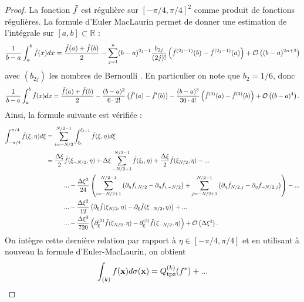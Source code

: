 \begin{proof}
La fonction $\tilde{f}$ est régulière sur $[-\pi/4, \pi/4]^2$ comme produit de fonctions régulières.
La formule d'Euler MacLaurin \cite{Demailly2016, Hardy2000, Monegato1998} permet de donner une estimation de l'intégrale sur $[a,b] \subset \mathbb{R}$ :
\begin{equation}
\dfrac{1}{b-a} \displaystyle\int_a^b \tilde{f}(x) dx = \dfrac{\tilde{f}(a) + \tilde{f}(b)}{2} - \displaystyle\sum\limits_{j=1}^n (b-a)^{2j-1} \dfrac{b_{2j}}{(2j)!} \left( \tilde{f}^{(2j-1)}(b) - \tilde{f}^{(2j-1)}(a)  \right) + \mathcal{O}\left( (b-a)^{2n+2}  \right) 
\end{equation}
avec $(b_{2j})$ les nombres de Bernoulli \cite{Conway2012}. En particulier on note que $b_2 = 1/6$, donc
\begin{equation}
\dfrac{1}{b-a} \displaystyle\int_a^b \tilde{f}(x) dx = \dfrac{\tilde{f}(a) + \tilde{f}(b)}{2} - \dfrac{(b-a)^2}{6 \cdot 2!} \left( \tilde{f}'(a) - \tilde{f}'(b) \right) - \dfrac{(b-a)^3}{30 \cdot 4!} \left( \tilde{f}^{(3)}(a) - \tilde{f}^{(3)}(b) \right) + \mathcal{O}\left( (b-a)^4 \right). 
\end{equation}
Ainsi, la formule suivante est vérifiée :
\begin{align*}
\displaystyle\int_{-\pi/4}^{\pi/4} \tilde{f}(\xi, \eta) d\xi & = \displaystyle\sum\limits_{i=-N/2}^{N/2-1} \displaystyle\int_{\xi_i}^{\xi_{i+1}} \tilde{f}(\xi, \eta) d\xi \\
	& = \dfrac{\Delta \xi}{2} \tilde{f}(\xi_{-N/2}, \eta) + \Delta \xi \displaystyle\sum\limits_{-N/2+1}^{N/2-1} \tilde{f}(\xi_i, \eta) + \dfrac{\Delta \xi}{2} \tilde{f}(\xi_{N/2}, \eta) - ... \\
	& \hspace{1cm}... - \dfrac{\Delta \xi^3}{24} \left( \displaystyle\sum\limits_{i=-N/2+1}^{N/2-1} \left( \partial_{\eta}\tilde{f}_{i, N/2} - \partial_{\eta}\tilde{f}_{i, -N/2} \right) + \displaystyle\sum\limits_{j=-N/2+1}^{N/2-1} \left( \partial_{\eta}\tilde{f}_{N/2,j} - \partial_{\eta}\tilde{f}_{-N/2,j} \right) \right) - ...  \\
	& \hspace{1cm} ... - \dfrac{\Delta \xi^2}{12} \left(\partial_{\xi} \tilde{f}(\xi_{N/2},\eta)- \partial_{\xi} \tilde{f}(\xi_{-N/2},\eta)  \right) + ...\\
	& \hspace{1cm} ... - \dfrac{\Delta \xi^3}{720} \left(\partial_{\xi}^{(3)} \tilde{f}(\xi_{N/2},\eta)- \partial_{\xi}^{(3)}\tilde{f}(\xi_{-N/2},\eta)  \right) + \mathcal{O} \left( \Delta \xi^4 \right).
\end{align*}
On intègre cette dernière relation par rapport à $\eta \in [- \pi/4, \pi/4]$ et en utilisant à nouveau la formule d'Euler-MacLaurin, on obtient
\begin{align*}
\gint_{(k)} f(\mathbf{x})d\sigma(\mathbf{x}) & = Q_{\tpz}^{(k)}(f^*) + ... \\

\end{align*}
\end{proof}
